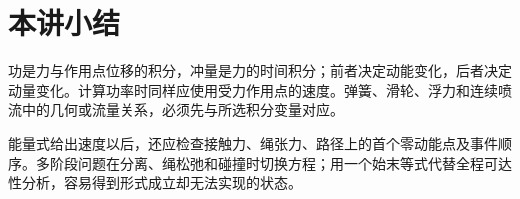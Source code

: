 \section{本讲小结}
功是力与作用点位移的积分，冲量是力的时间积分；前者决定动能变化，后者决定动量变化。计算功率时同样应使用受力作用点的速度。弹簧、滑轮、浮力和连续喷流中的几何或流量关系，必须先与所选积分变量对应。

能量式给出速度以后，还应检查接触力、绳张力、路径上的首个零动能点及事件顺序。多阶段问题在分离、绳松弛和碰撞时切换方程；用一个始末等式代替全程可达性分析，容易得到形式成立却无法实现的状态。
